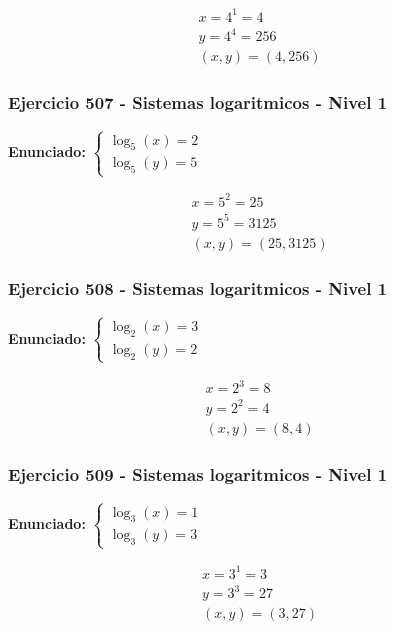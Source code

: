 \documentclass[12pt,a4paper]{article}
\begin{document}
\[
\begin{aligned}
x=4^{1}=4\\
y=4^{4}=256\\
\boxed{(x,y)=(4,256)}
\end{aligned}
\]


\subsubsection*{Ejercicio 507 - Sistemas logaritmicos - Nivel 1}
\textbf{Enunciado:} \(\begin{cases} \log_{5}\left(x\right)=2\\ \log_{5}\left(y\right)=5\end{cases}\)

\[
\begin{aligned}
x=5^{2}=25\\
y=5^{5}=3125\\
\boxed{(x,y)=(25,3125)}
\end{aligned}
\]


\subsubsection*{Ejercicio 508 - Sistemas logaritmicos - Nivel 1}
\textbf{Enunciado:} \(\begin{cases} \log_{2}\left(x\right)=3\\ \log_{2}\left(y\right)=2\end{cases}\)

\[
\begin{aligned}
x=2^{3}=8\\
y=2^{2}=4\\
\boxed{(x,y)=(8,4)}
\end{aligned}
\]


\subsubsection*{Ejercicio 509 - Sistemas logaritmicos - Nivel 1}
\textbf{Enunciado:} \(\begin{cases} \log_{3}\left(x\right)=1\\ \log_{3}\left(y\right)=3\end{cases}\)

\[
\begin{aligned}
x=3^{1}=3\\
y=3^{3}=27\\
\boxed{(x,y)=(3,27)}
\end{aligned}
\]
\end{document}
